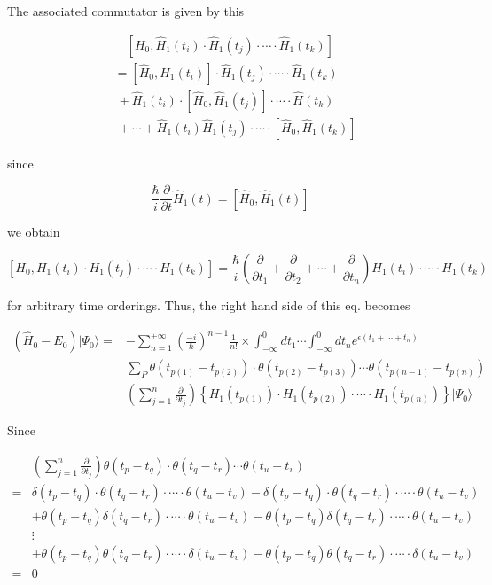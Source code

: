 The associated commutator is given by this

\[\begin{split}
&\quad[H_0,\hat{H}_1(t_i)\cdot\hat{H}_1(t_j)\cdot\cdots\cdot\hat{H}_1(t_k)]\\
&=[\hat{H}_0,\hat{H}_1(t_i)]\cdot\hat{H}_1(t_j)\cdot\cdots\cdot\hat{H}_1(t_k)\\
&\ +\hat{H}_1(t_i)\cdot[\hat{H}_0,\hat{H}_1(t_j)]\cdot\cdots\cdot\hat{H}(t_k)\\
&\ +\cdots+\hat{H}_1(t_i)\hat{H}_1(t_j)\cdot\cdots\cdot[\hat{H}_0,\hat{H}_1(t_k)]
\end{split}\]

since

\[\frac{\hbar}{i}\frac{\partial}{\partial t}\hat{H}_1(t)=[\hat{H}_0,\hat{H}_1(t)] \]

we obtain

\[[H_0,H_1(t_i)\cdot H_1(t_j) \cdot\cdots\cdot H_1(t_k)]=\frac{\hbar}{i}\left(\frac{\partial}{\partial t_1}+\frac{\partial}{\partial t_2}+\cdots+\frac{\partial}{\partial t_n}\right)H_1(t_i)\cdot\cdots\cdot H_1(t_k) \]

for arbitrary time orderings. Thus, the right hand side of this eq. becomes

\[\begin{split}
(\hat{H}_0-E_0)|\Psi_0\rangle =& -\sum_{n=1}^{+\infty}\left(\frac{-i}{\hbar}\right)^{n-1}\frac{1}{n!}\times\int_{-\infty}^0 dt_1\cdots\int_{-\infty}^0 dt_n e^{\epsilon(t_1+\cdots+t_n)}\\
&\sum_P\theta(t_{p(1)}-t_{p(2)})\cdot\theta(t_{p(2)}-t_{p(3)})\cdots\theta(t_{p(n-1)}-t_{p(n)})\\
&\left(\sum_{j=1}^n\frac{\partial}{\partial t_j}\right) \left\{H_1(t_{p(1)})\cdot H_1(t_{p(2)})\cdot\cdots\cdot H_1(t_{p(n)})\right\} |\Psi_0\rangle
\end{split}\]

Since

\[\begin{split}
&\left(\sum_{j=1}^n\frac{\partial}{\partial t_j}\right)\theta(t_p-t_q)\cdot\theta(t_q-t_r)\cdots\theta(t_u-t_v)\\
=&\delta(t_p-t_q)\cdot\theta(t_q-t_r)\cdot\cdots\cdot\theta(t_u-t_v)-\delta(t_p-t_q)\cdot\theta(t_q-t_r)\cdot\cdots\cdot\theta(t_u-t_v)\\
&+\theta(t_p-t_q)\delta(t_q-t_r)\cdot\cdots\cdot\theta(t_u-t_v)-\theta(t_p-t_q)\delta(t_q-t_r)\cdot\cdots\cdot\theta(t_u-t_v)\\
&\vdots\\
&+\theta(t_p-t_q)\theta(t_q-t_r)\cdot\cdots\cdot\delta(t_u-t_v)-\theta(t_p-t_q)\theta(t_q-t_r)\cdot\cdots\cdot\delta(t_u-t_v)\\
=&0
\end{split}\]

